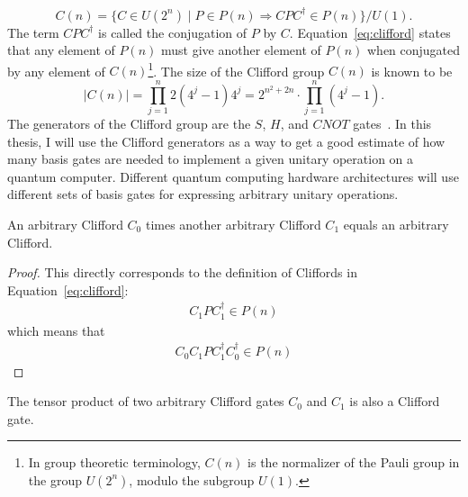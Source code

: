 \begin{equation}
\label{eq:clifford}
C(n)
=
\{
C \in U(2^n) 
\mid 
P \in P(n)
\Rightarrow 
C P C^\dagger \in P(n)
\}
/
U(1).
\end{equation}
The term $C P C^\dagger$ 
is called the conjugation of $P$ by $C$. Equation~\eqref{eq:clifford} states that any element of $P(n)$ must give another element of $P(n)$ when conjugated by any element of $C(n)$\footnote{In group theoretic terminology, $C(n)$ is the normalizer of the Pauli group in the group $U(2^n)$, modulo the subgroup $U(1)$.}. The size of the Clifford group $C(n)$ is known to be
\begin{equation}
\label{eq:cliffordgroupcardinal}
\vert C(n) \vert
=
\displaystyle\prod_{j=1}^n 2(4^j - 1) 4^j 
=
2^{n^{2}+2n} \cdot \displaystyle\prod_{j=1}^n \left(4^{j} -1 \right).
\end{equation}
The generators of the Clifford group are the $S$, $H$, and $\mathit{CNOT}$ gates~\cite{ozols2008clifford}. In this thesis, I will use the Clifford generators as a way to get a good estimate of how many basis gates are needed to implement a given unitary operation on a quantum computer. Different quantum computing hardware architectures will use different sets of basis gates for expressing arbitrary unitary operations.
\begin{theorem}
\label{theorem:cliffordTimesClifford}
An arbitrary Clifford $C_0$ times another arbitrary Clifford $C_1$ equals an arbitrary Clifford.
\end{theorem}
\begin{proof}
This directly corresponds to the definition of Cliffords in Equation~\eqref{eq:clifford}:
\begin{align}
C_1 P C_1^\dagger \in P(n)
\end{align}
which means that
\begin{align}
C_0C_1 P C_1^\dagger C_0^\dagger \in P(n)
\end{align}
\end{proof}
\begin{theorem}
\label{theorem:cliffTensorProduct}
The tensor product of two arbitrary Clifford gates $C_0$ and $C_1$ is also a Clifford gate.
\end{theorem}
